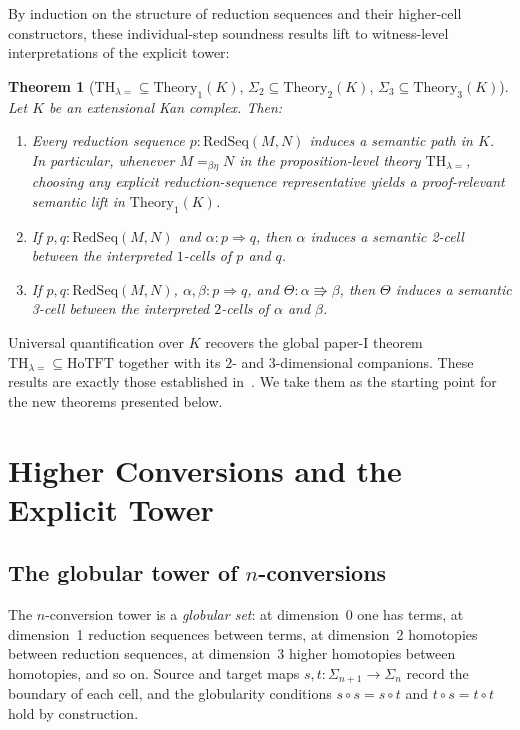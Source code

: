 \documentclass[webpdf,traditional,large,numbered]{oup-authoring-template}
\theoremstyle{thmstyleone}%
\newtheorem{theorem}{Theorem}[section]
\theoremstyle{thmstyletwo}%
\theoremstyle{thmstylethree}%
\newcommand{\THeq}{\mathrm{TH}_{\lambda =}}
\newcommand{\HoTFT}{\mathrm{HoTFT}}
\newcommand{\ReductionSeq}{\mathrm{RedSeq}}
\begin{document}
By induction on the structure of reduction sequences and their higher-cell
constructors, these individual-step soundness results lift to witness-level
interpretations of the explicit tower:

\begin{theorem}[{$\THeq \subseteq \mathrm{Theory}_1(K)$,
  $\Sigma_2 \subseteq \mathrm{Theory}_2(K)$,
  $\Sigma_3 \subseteq \mathrm{Theory}_3(K)$}]
\label{thm:baseline}
  Let $K$ be an extensional Kan complex. Then:
  \begin{enumerate}[label=(\roman*)]
    \item Every reduction sequence $p : \ReductionSeq(M,N)$ induces a semantic
      path in $K$.  In particular, whenever $M =_{\beta\eta} N$ in the
      proposition-level theory $\THeq$, choosing any explicit
      reduction-sequence representative yields a proof-relevant semantic lift in
      $\mathrm{Theory}_1(K)$.
    \item If $p,q : \ReductionSeq(M,N)$ and $\alpha : p \Rightarrow q$, then
      $\alpha$ induces a semantic 2-cell between the interpreted $1$-cells of
      $p$ and $q$.
    \item If $p,q : \ReductionSeq(M,N)$, $\alpha,\beta : p \Rightarrow q$, and
      $\Theta : \alpha \Rrightarrow \beta$, then $\Theta$ induces a semantic
      3-cell between the interpreted $2$-cells of $\alpha$ and $\beta$.
  \end{enumerate}
\end{theorem}

Universal quantification over $K$ recovers the global paper-I theorem
$\THeq \subseteq \HoTFT$ together with its $2$- and $3$-dimensional companions.
These results are exactly those established in~\cite{MRdQ:theory}.  We take
them as the starting point for the new theorems presented below.

\section{Higher Conversions and the Explicit Tower}\label{sec:tower}

\subsection{The globular tower of \texorpdfstring{$n$}{n}-conversions}

The $n$-conversion tower is a \emph{globular set}: at dimension~0 one has
terms, at dimension~1 reduction sequences between terms, at dimension~2
homotopies between reduction sequences, at dimension~3 higher homotopies
between homotopies, and so on. Source and target maps $s, t : \Sigma_{n+1} \to
\Sigma_n$ record the boundary of each cell, and the globularity conditions
$s \circ s = s \circ t$ and $t \circ s = t \circ t$ hold by construction.
\end{document}
